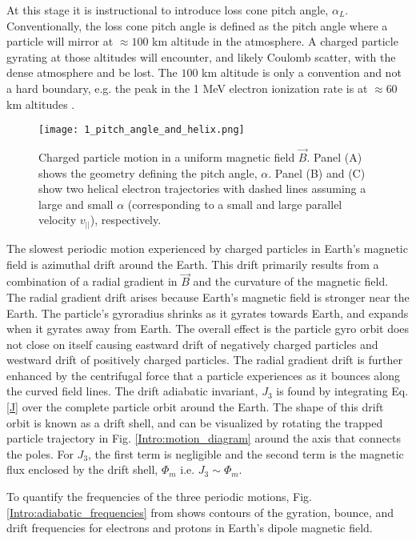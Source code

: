 At this stage it is instructional to introduce loss cone pitch angle, $\alpha_L$.  Conventionally, the loss cone pitch angle is defined as the pitch angle where a particle will mirror at $\approx 100$ km altitude in the atmosphere. A charged particle gyrating at those altitudes will encounter, and likely Coulomb scatter, with the dense atmosphere and be lost. The $100$ km altitude is only a convention and not a hard boundary, e.g. the peak in the 1 MeV electron ionization rate is at $\approx 60$ km altitudes \citep{Fang2010}.

\begin{figure}
\texttt{[image: 1\_pitch\_angle\_and\_helix.png]}
\caption{Charged particle motion in a uniform magnetic field $\vec{B}$. Panel (A) shows the geometry defining the pitch angle, $\alpha$. Panel (B) and (C) show two helical electron trajectories with dashed lines assuming a large and small $\alpha$ (corresponding to a small and large parallel velocity $v_{||}$), respectively.}
\label{Intro:pa}
\end{figure}

The slowest periodic motion experienced by charged particles in Earth's magnetic field is azimuthal drift around the Earth. This drift primarily results from a combination of a radial gradient in $\vec{B}$ and the curvature of the magnetic field. The radial gradient drift arises because Earth's magnetic field is stronger near the Earth. The particle's gyroradius shrinks as it gyrates towards Earth, and expands when it gyrates away from Earth. The overall effect is the particle gyro orbit does not close on itself causing eastward drift of negatively charged particles and westward drift of positively charged particles. The radial gradient drift is further enhanced by the centrifugal force that a particle experiences as it bounces along the curved field lines. The drift adiabatic invariant, $J_3$ is found by integrating Eq. \ref{J} over the complete particle orbit around the Earth. The shape of this drift orbit is known as a drift shell, and can be visualized by rotating the trapped particle trajectory in Fig. \ref{Intro:motion_diagram} around the axis that connects the poles. For $J_3$, the first term is negligible and the second term is the magnetic flux enclosed by the drift shell, $\Phi_m$  i.e. $J_3 \sim \Phi_m$.

To quantify the frequencies of the three periodic motions, Fig. \ref{Intro:adiabatic_frequencies} from \citet{Schulz1974} shows contours of the gyration, bounce, and drift frequencies for electrons and protons in Earth's dipole magnetic field. 

